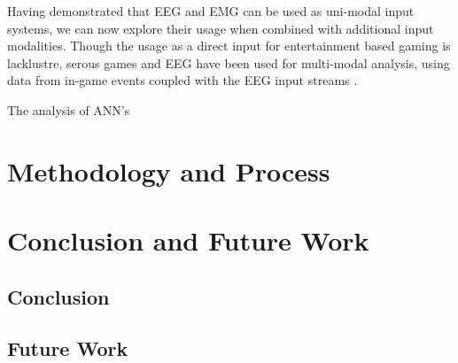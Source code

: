 \documentclass[11pt, a4paper]{article}
\begin{document}
\hfill

Having demonstrated that EEG and EMG can be used as uni-modal input systems, we can now explore their usage when combined with additional input modalities. Though the usage as a direct input for entertainment based gaming is lacklustre, serous games and EEG have been used for multi-modal analysis, using data from in-game events coupled with the EEG input streams \cite{sivanathan2014temporal}. 

\hfill

The analysis of ANN's


\iffalse
\begin{itemize}
  \item Multi-modal input systems in games (keyboard or something more generic)
  \item EEG in games
  \item EMG in games
  \item Multi modal EEG systems (wheel chair, prosthetics)
  \item ANN's, Computer Vision
\end{itemize}
\fi




\pagebreak
\section{Methodology and Process}			%





\pagebreak
\section{Conclusion and Future Work}

\subsection{Conclusion}

\subsection{Future Work}			%




\pagebreak


\end{document}
